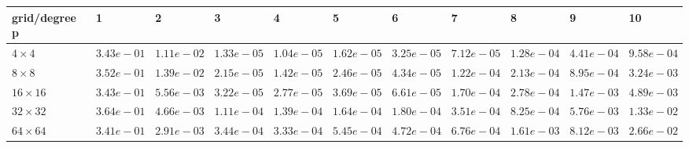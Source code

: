 \begin{tabular}{lllllllllll}
\hline
 grid/degree p   & 1          & 2          & 3          & 4          & 5          & 6          & 7          & 8          & 9          & 10         \\
\hline
 $4 \times 4$    & $3.43e-01$ & $1.11e-02$ & $1.33e-05$ & $1.04e-05$ & $1.62e-05$ & $3.25e-05$ & $7.12e-05$ & $1.28e-04$ & $4.41e-04$ & $9.58e-04$ \\
 $8 \times 8$    & $3.52e-01$ & $1.39e-02$ & $2.15e-05$ & $1.42e-05$ & $2.46e-05$ & $4.34e-05$ & $1.22e-04$ & $2.13e-04$ & $8.95e-04$ & $3.24e-03$ \\
 $16 \times 16$  & $3.43e-01$ & $5.56e-03$ & $3.22e-05$ & $2.77e-05$ & $3.69e-05$ & $6.61e-05$ & $1.70e-04$ & $2.78e-04$ & $1.47e-03$ & $4.89e-03$ \\
 $32 \times 32$  & $3.64e-01$ & $4.66e-03$ & $1.11e-04$ & $1.39e-04$ & $1.64e-04$ & $1.80e-04$ & $3.51e-04$ & $8.25e-04$ & $5.76e-03$ & $1.33e-02$ \\
 $64 \times 64$  & $3.41e-01$ & $2.91e-03$ & $3.44e-04$ & $3.33e-04$ & $5.45e-04$ & $4.72e-04$ & $6.76e-04$ & $1.61e-03$ & $8.12e-03$ & $2.66e-02$ \\
\hline
\end{tabular}